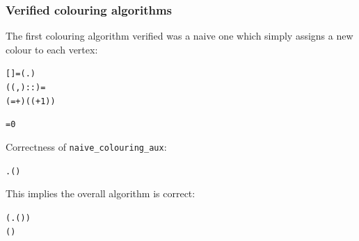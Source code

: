 \documentclass{beamer}
\begin{document}
\begin{frame}[containsverbatim]
\frametitle{Verified colouring algorithms}
The first colouring algorithm verified was a naive one which simply assigns a new colour to each vertex:

\begin{alltt}\small
	  = (\HOLTokenLambda{}. )
 ((,)::)  =
( =+ ) (  ( + 1))
\end{alltt}

\begin{alltt}\small
	  =   0
\end{alltt}

Correctness of \texttt{naive_colouring_aux}:

\begin{alltt}\small
	\HOLTokenTurnstile{}   \HOLTokenImp{}
   \HOLTokenForall{}.  (  ) 
\end{alltt}

This implies the overall algorithm is correct:

\begin{alltt}\small
	\HOLTokenTurnstile{} (\HOLTokenForall{}.  (  ) ) \HOLTokenImp{}
    ( ) 
\end{alltt}
\end{frame}
\end{document}
